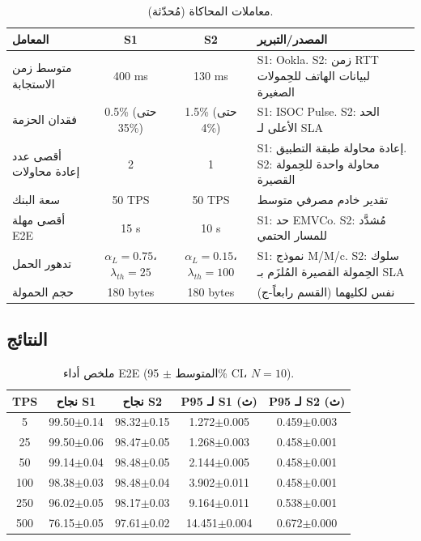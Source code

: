 \documentclass[12pt,a4paper]{article}
\begin{document}
\begin{table}[h]
\centering
\caption{معاملات المحاكاة (مُحدّثة).}
\label{tab:sim_params}
\small
\begin{tabular}{@{}p{3.5cm}ccp{5cm}@{}}
\toprule
\textbf{المعامل} & \textbf{S1} & \textbf{S2} & \textbf{المصدر/التبرير} \\
\midrule
متوسط زمن الاستجابة & 400 ms & 130 ms & S1: Ookla. S2: زمن RTT لبيانات الهاتف للحِمولات الصغيرة \\
فقدان الحزمة & 0.5\% (حتى 35\%) & 1.5\% (حتى 4\%) & S1: ISOC Pulse. S2: الحد الأعلى لـ SLA \\
أقصى عدد إعادة محاولات & 2 & 1 & S1: إعادة محاولة طبقة التطبيق. S2: محاولة واحدة للحِمولة القصيرة \\
سعة البنك & 50 TPS & 50 TPS & تقدير خادم مصرفي متوسط \\
أقصى مهلة E2E & 15 s & 10 s & S1: حد EMVCo. S2: مُشدَّد للمسار الحتمي \\
تدهور الحمل & $\alpha_L=0.75$، $\lambda_{th}=25$ & $\alpha_L=0.15$، $\lambda_{th}=100$ & S1: نموذج M/M/c. S2: سلوك الحِمولة القصيرة المُلزَم بـ SLA \\
حجم الحمولة & 180 bytes & 180 bytes & نفس لكليهما (القسم رابعاً-ج) \\
\bottomrule
\end{tabular}
\end{table}

\subsection{النتائج}

\begin{table}[h]
\centering
\caption{ملخص أداء E2E (المتوسط $\pm$ 95\% CI، $N=10$).}
\label{tab:results}
\small
\begin{tabular}{@{}ccccc@{}}
\toprule
\textbf{TPS} & \textbf{نجاح S1} & \textbf{نجاح S2} & \textbf{P95 لـ S1 (ث)} & \textbf{P95 لـ S2 (ث)} \\
\midrule
5 & 99.50$\pm$0.14 & 98.32$\pm$0.15 & 1.272$\pm$0.005 & 0.459$\pm$0.003 \\
25 & 99.50$\pm$0.06 & 98.47$\pm$0.05 & 1.268$\pm$0.003 & 0.458$\pm$0.001 \\
50 & 99.14$\pm$0.04 & 98.48$\pm$0.05 & 2.144$\pm$0.005 & 0.458$\pm$0.001 \\
100 & 98.38$\pm$0.03 & 98.48$\pm$0.04 & 3.902$\pm$0.011 & 0.458$\pm$0.001 \\
250 & 96.02$\pm$0.05 & 98.17$\pm$0.03 & 9.164$\pm$0.011 & 0.538$\pm$0.001 \\
500 & 76.15$\pm$0.05 & 97.61$\pm$0.02 & 14.451$\pm$0.004 & 0.672$\pm$0.000 \\
\bottomrule
\end{tabular}
\end{table}
\end{document}
